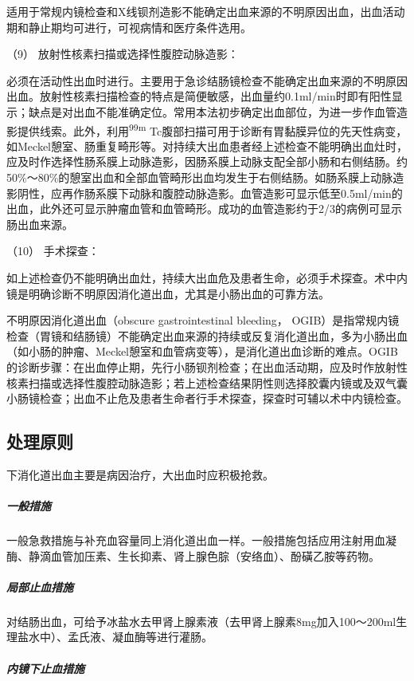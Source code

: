 适用于常规内镜检查和X线钡剂造影不能确定出血来源的不明原因出血，出血活动期和静止期均可进行，可视病情和医疗条件选用。

\hypertarget{text00033.htmlux5cux23CHP1-13-2-1-5-9}{}
（9） 放射性核素扫描或选择性腹腔动脉造影：

必须在活动性出血时进行。主要用于急诊结肠镜检查不能确定出血来源的不明原因出血。放射性核素扫描检查的特点是简便敏感，出血量约0.1ml/min时即有阳性显示；缺点是对出血不能准确定位。常用本法初步确定出血部位，为进一步作血管造影提供线索。此外，利用\textsuperscript{99m}
Tc腹部扫描可用于诊断有胃黏膜异位的先天性病变，如Meckel憩室、肠重复畸形等。对持续大出血患者经上述检查不能明确出血灶时，应及时作选择性肠系膜上动脉造影，因肠系膜上动脉支配全部小肠和右侧结肠。约50\%～80\%的憩室出血和全部血管畸形出血均发生于右侧结肠。如肠系膜上动脉造影阴性，应再作肠系膜下动脉和腹腔动脉造影。血管造影可显示低至0.5ml/min的出血，此外还可显示肿瘤血管和血管畸形。成功的血管造影约于2/3的病例可显示肠出血来源。

\hypertarget{text00033.htmlux5cux23CHP1-13-2-1-5-10}{}
（10） 手术探查：

如上述检查仍不能明确出血灶，持续大出血危及患者生命，必须手术探查。术中内镜是明确诊断不明原因消化道出血，尤其是小肠出血的可靠方法。

不明原因消化道出血（obscure gastrointestinal bleeding，
OGIB）是指常规内镜检查（胃镜和结肠镜）不能确定出血来源的持续或反复消化道出血，多为小肠出血（如小肠的肿瘤、Meckel憩室和血管病变等），是消化道出血诊断的难点。OGIB的诊断步骤：在出血停止期，先行小肠钡剂检查；在出血活动期，应及时作放射性核素扫描或选择性腹腔动脉造影；若上述检查结果阴性则选择胶囊内镜或及双气囊小肠镜检查；出血不止危及患者生命者行手术探查，探查时可辅以术中内镜检查。

\subsection{处理原则}

下消化道出血主要是病因治疗，大出血时应积极抢救。

\subparagraph{一般措施}

一般急救措施与补充血容量同上消化道出血一样。一般措施包括应用注射用血凝酶、静滴血管加压素、生长抑素、肾上腺色腙（安络血）、酚磺乙胺等药物。

\subparagraph{局部止血措施}

对结肠出血，可给予冰盐水去甲肾上腺素液（去甲肾上腺素8mg加入100～200ml生理盐水中）、孟氏液、凝血酶等进行灌肠。

\subparagraph{内镜下止血措施}

